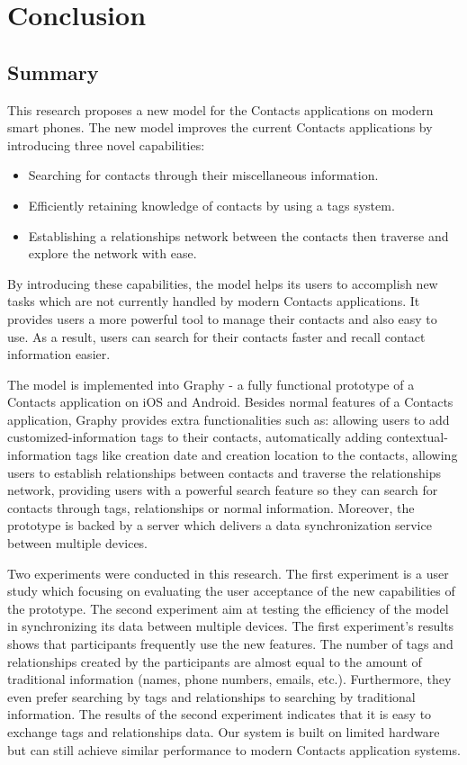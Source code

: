 \chapter{Conclusion}
\section{Summary}
This research proposes a new model for the Contacts applications on modern smart phones. The new model improves the current Contacts applications by introducing three novel capabilities:

\begin{itemize}
    \item {Searching for contacts through their miscellaneous information.}
    \item {Efficiently retaining knowledge of contacts by using a tags system.} 
    \item {Establishing a relationships network between the contacts then traverse and explore the network with ease.}
\end{itemize}

By introducing these capabilities, the model helps its users to accomplish new tasks which are not currently handled by modern Contacts applications. It provides users a more powerful tool to manage their contacts and also easy to use. As a result, users can search for their contacts faster and recall contact information easier.

The model is implemented into Graphy - a fully functional prototype of a Contacts application on iOS and Android. Besides normal features of a Contacts application, Graphy provides extra functionalities such as: allowing users to add customized-information tags to their contacts, automatically adding contextual-information tags like creation date and creation location to the contacts, allowing users to establish relationships between contacts and traverse the relationships network, providing users with a powerful search feature so they can search for contacts through tags, relationships or normal information. Moreover, the prototype is backed by a server which delivers a data synchronization service between multiple devices.

Two experiments were conducted in this research. The first experiment is a user study which focusing on evaluating the user acceptance of the new capabilities of the prototype. The second experiment aim at testing the efficiency of the model in synchronizing its data between multiple devices. The first experiment's results shows that participants frequently use the new features. The number of tags and relationships created by the participants are almost equal to the amount of traditional information (names, phone numbers, emails, etc.). Furthermore, they even prefer searching by tags and relationships to searching by traditional information. The results of the second experiment indicates that it is easy to exchange tags and relationships data. Our system is built on limited hardware but can still achieve similar performance to modern Contacts application systems.

